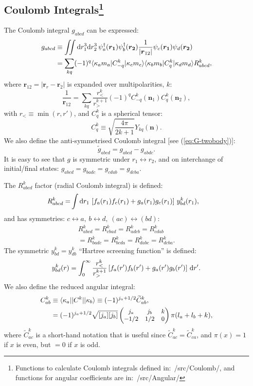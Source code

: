 \documentclass[10pt,twocolumn,a4paper]{article}%
\newcommand{\bra}[1]{\ensuremath{\langle #1|}}	%
\newcommand{\ket}[1]{\ensuremath{|#1\rangle}}	%
\newcommand{\threej}[6]{\small\ensuremath{\begin{pmatrix}#1&#2&#3\\#4&#5&#6\end{pmatrix}}}	%
\renewcommand{\v}[1]{\ensuremath{\boldsymbol{#1}}}		%
\newcommand{\be}{\begin{equation}}
\newcommand{\ee}{\end{equation}}
\def\d{\ensuremath{{\rm d}}}
\newcommand{\psidag}{\ensuremath{\psi^\dagger}}	%
\renewcommand{\k}{\ensuremath{\kappa}}
\begin{document}
\subsection[Coulomb Integrals]{Coulomb Integrals\label{sec:app-Coulomb}\footnote{Functions to calculate Coulomb integrals defined in:~/src/Coulomb/, and functions for angular coefficients are in:~/src/Angular/}}

The Coulomb integral $g_{abcd}$ can be expressed:
\begin{equation}\label{eq:gabcd}\begin{split}
g_{abcd} &\equiv \iint\d r_1^3\d r_2^3 \, \psidag_a(\v{r_1})\psidag_b(\v{r_2})\frac{1}{|\v{r}_{12}|}\psi_c(\v{r_1})\psi_d(\v{r_2}) \\
& = \sum_{kq} (-1)^q \bra{\k_a m_a}C^k_{-q}\ket{\k_c m_c} \bra{\k_b m_b}C^k_{q}\ket{\k_d m_d} R^k_{abcd},
\end{split}\end{equation}
where $\v{r}_{12}=|\v{r}_r-\v{r}_2|$ is expanded over multipolarities, $k$:
\be
\frac{1}{\v{r}_{12}} = \sum_{kq} \frac{r_<^k}{r_>^{k+1}}(-1)^q C^k_{-q}(\v{n}_1)C^k_{q}(\v{n}_2),
\ee
with $r_{<} \equiv \min(r,r')$, and $C^k_{q}$ is a spherical tensor:
\be
C^k_{q} \equiv \sqrt{\frac{4\pi}{2k+1}}Y_{kq}(\v{n}).
\ee
We also define the anti-symmetrised Coulomb integral [see (\ref{eq:G-twobody})]:
\be
 \widetilde g_{abcd} =  g_{abcd} -  g_{abdc}.
\ee
It is easy to see that $g$ is symmetric under $r_1\leftrightarrow r_2$, and on interchange of initial/final states:
$g_{abcd} = g_{badc} = g_{cdab} = g_{dcba}$.


The $R^k_{abcd}$ factor (radial Coulomb integral) is defined:
\begin{align}
R^k_{abcd} =& \int\d r_1 \, \left[f_a(r_1)f_c(r_1) + g_a(r_1)g_c(r_1)\right]\, y^k_{bd}(r_1),
\end{align}
and has symmetries: $c\leftrightarrow a ,~ b\leftrightarrow d  ,~ (ac)\leftrightarrow (bd)$:
\begin{multline}
 R^k_{abcd} =R^k_{cbad} =R^k_{adcb} =R^k_{cdab} \\=R^k_{badc} =R^k_{bcda} =R^k_{dabc} =R^k_{dcba}.
\end{multline}
The symmetric $y^k_{bd} = y^k_{db}$ ``Hartree screening function'' is defined:
\be
y^k_{bd}(r) = \int_0^\infty \frac{r_<^k}{r_>^{k+1}}\left[f_a(r') f_b(r') + g_a(r') g_b(r')\right]\, \d r'.
\ee
We also define the reduced angular integral:
\begin{align}
C^k_{ab}&\equiv \bra{\k_a}|C^k|\ket{\k_b} \equiv  (-1)^{j_a+1/2} \widetilde C^k_{ab} ,\\
&= (-1)^{j_a+1/2}\sqrt{[j_a][j_b]}\threej{j_a}{j_b}{k}{-1/2}{1/2}{0}\pi(l_a+l_b+k) ,
\end{align}
where $\widetilde C^k_{ac}$
 is a short-hand notation that is useful since $\widetilde C^k_{ac} = \widetilde C^k_{ca}$, and $\pi(x)=1$ if $x$ is even, but $=0$ if $x$ is odd.
\end{document}
